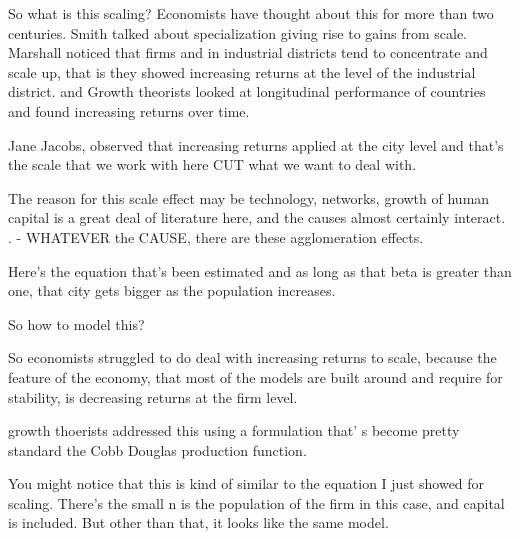 \documentclass[]{article}
\begin{document}
So what is this  scaling?
Economists have thought about this for more than two centuries. Smith talked about specialization giving rise to gains from scale. 
Marshall noticed that firms and in industrial districts tend to concentrate and scale up, that is they showed increasing returns at the level of the industrial district. 
and Growth theorists looked at longitudinal performance of countries and found increasing returns over time.

Jane Jacobs, observed that increasing returns applied at the city level and that's the scale that we work with here CUT what we want to deal with.

The reason for this scale effect may be technology, networks, growth of human capital is a great deal of literature here, and the causes almost certainly interact. . - WHATEVER the CAUSE, there are these agglomeration effects. 

Here's the equation that's been estimated and as long as that beta is greater than one, that city gets bigger as the population increases.

So how to model this?


So economists struggled to do deal with increasing returns to scale, because the feature of the economy, that most of the models are built around and require for stability, is decreasing returns at the firm level. %

growth thoerists addressed this using a formulation that' s become pretty standard
the Cobb Douglas production function.  %

You might notice that this is kind of similar to the equation I just showed  for scaling. There's the small n is the population of the firm in this case, and capital is included. But other than that, it looks like the same model. 
\end{document}
